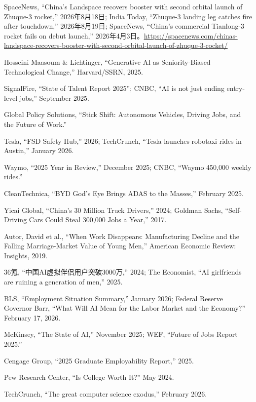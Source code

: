 \documentclass[11pt,a4paper]{ctexart}
\begin{document}
\noindent [80] SpaceNews, ``China's Landspace recovers booster with second orbital launch of Zhuque-3 rocket,'' 2026年8月18日; India Today, ``Zhuque-3 landing leg catches fire after touchdown,'' 2026年8月19日; SpaceNews, ``China's commercial Tianlong-3 rocket fails on debut launch,'' 2026年4月3日。\url{https://spacenews.com/chinas-landspace-recovers-booster-with-second-orbital-launch-of-zhuque-3-rocket/}

\noindent [81] Hosseini Maasoum \& Lichtinger, ``Generative AI as Seniority-Biased Technological Change,'' Harvard/SSRN, 2025.

\noindent [82] SignalFire, ``State of Talent Report 2025''; CNBC, ``AI is not just ending entry-level jobs,'' September 2025.

\noindent [83] Global Policy Solutions, ``Stick Shift: Autonomous Vehicles, Driving Jobs, and the Future of Work.''

\noindent [84] Tesla, ``FSD Safety Hub,'' 2026; TechCrunch, ``Tesla launches robotaxi rides in Austin,'' January 2026.

\noindent [85] Waymo, ``2025 Year in Review,'' December 2025; CNBC, ``Waymo 450,000 weekly rides.''

\noindent [86] CleanTechnica, ``BYD God's Eye Brings ADAS to the Masses,'' February 2025.

\noindent [87] Yicai Global, ``China's 30 Million Truck Drivers,'' 2024; Goldman Sachs, ``Self-Driving Cars Could Steal 300,000 Jobs a Year,'' 2017.

\noindent [88] Autor, David et al., ``When Work Disappears: Manufacturing Decline and the Falling Marriage-Market Value of Young Men,'' American Economic Review: Insights, 2019.

\noindent [89] 36氪, ``中国AI虚拟伴侣用户突破3000万,'' 2024; The Economist, ``AI girlfriends are ruining a generation of men,'' 2025.

\noindent [90] BLS, ``Employment Situation Summary,'' January 2026; Federal Reserve Governor Barr, ``What Will AI Mean for the Labor Market and the Economy?'' February 17, 2026.

\noindent [91] McKinsey, ``The State of AI,'' November 2025; WEF, ``Future of Jobs Report 2025.''

\noindent [92] Cengage Group, ``2025 Graduate Employability Report,'' 2025.

\noindent [93] Pew Research Center, ``Is College Worth It?'' May 2024.

\noindent [94] TechCrunch, ``The great computer science exodus,'' February 2026.
\end{document}
